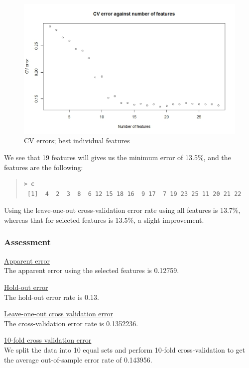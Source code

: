 \documentclass[11pt, a4paper]{article}
\begin{document}
\begin{figure}[H]
\centering
	\includegraphics[scale=0.4]{ldacv2.jpeg}
\caption{CV errors; best individual features}
\end{figure}

We see that 19 features will gives us the minimum error of 13.5\%, and the features are the following:

\begin{quote}
\begin{verbatim}
> c
 [1]  4  2  3  8  6 12 15 18 16  9 17  7 19 23 25 11 20 21 22
\end{verbatim}
\end{quote}

Using the leave-one-out cross-validation error rate using all features is 13.7\%, whereas that for selected features is 13.5\%, a slight improvement.

\subsubsection{Assessment}

\underline{Apparent error}
\\
The apparent error using the selected features is 0.12759.

\underline{Hold-out error}
\\
The hold-out error rate is 0.13.

\underline{Leave-one-out cross validation error}
\\
The cross-validation error rate is 0.1352236.

\underline{10-fold cross validation error}
\\
We split the data into 10 equal sets and perform 10-fold cross-validation to get the average out-of-sample error rate of 0.143956.
\end{document}
